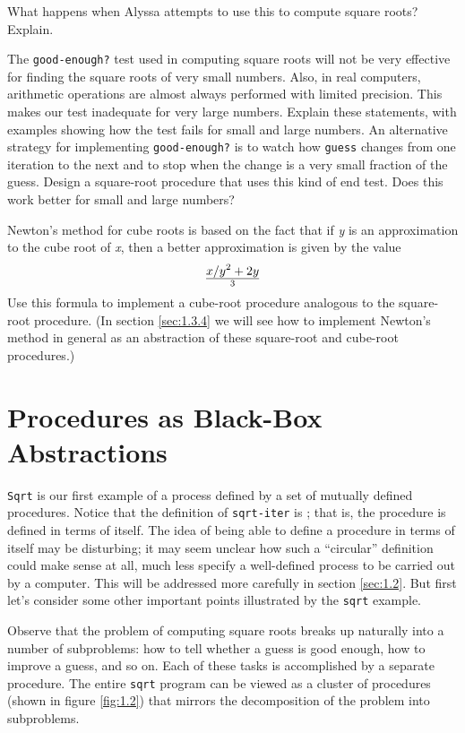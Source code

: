 \begin{schemedisplay}
\begin{Exercise}
What happens when Alyssa attempts to use this to compute square roots?
Explain.
\end{Exercise}

\begin{Exercise}
\label{exc:1.7}
The \texttt{good-enough?} test used in computing square roots will not
be very effective for finding the square roots of very small numbers.
Also, in real computers, arithmetic operations are almost always
performed with limited precision.  This makes our test inadequate for
very large numbers.  Explain these statements, with examples showing
how the test fails for small and large numbers.  An alternative
strategy for implementing \texttt{good-enough?} is to watch how
\texttt{guess} changes from one iteration to the next and to stop when
the change is a very small fraction of the guess.  Design a
square-root procedure that uses this kind of end test.  Does this work
better for small and large numbers?
\end{Exercise}

\begin{Exercise}
\label{exc:1.8}
Newton's method for cube roots is based on the fact that if \textit{y} is an
approximation to the cube root of \textit{x}, then a better approximation is
given by the value $$x / y^2 + 2y \over 3$$
Use this formula to implement a cube-root procedure analogous to the
square-root procedure.  (In section \ref{sec:1.3.4} we
will see how to implement Newton's method in general as an abstraction
of these square-root and cube-root procedures.)
\end{Exercise}

\section{Procedures as Black-Box Abstractions}
\label{sec:1.1.8}

\texttt{Sqrt} is our first example of a process defined by a set of
mutually defined procedures.  Notice that the definition of
\texttt{sqrt-iter} is ; that is, the procedure is
defined in terms of itself.  The idea of being able to define a
procedure in terms of itself may be disturbing; it may seem unclear
how such a ``circular'' definition could make sense at all, much less
specify a well-defined process to be carried out by a computer.  This
will be addressed more carefully in section \ref{sec:1.2}.  But first
let's consider some other important points illustrated by the
\texttt{sqrt} example.

Observe that the problem of computing square roots breaks up naturally
into a number of subproblems: how to tell whether a guess is good
enough, how to improve a guess, and so on.  Each of these tasks is
accomplished by a separate procedure.  The entire \texttt{sqrt} program
can be viewed as a cluster of procedures (shown in
figure \ref{fig:1.2}) that mirrors the decomposition of
the problem into subproblems.


\end{schemedisplay}
